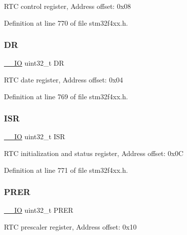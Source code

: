 R\+TC control register, Address offset\+: 0x08 

Definition at line 770 of file stm32f4xx.\+h.

\mbox{\label{struct_r_t_c___type_def_a3df0d8dfcd1ec958659ffe21eb64fa94}} 
\subsubsection{\texorpdfstring{DR}{DR}}
{\footnotesize\ttfamily \hyperlink{group___c_m_s_i_s__core__definitions_gaec43007d9998a0a0e01faede4133d6be}{\+\_\+\+\_\+\+IO} uint32\+\_\+t DR}

R\+TC date register, Address offset\+: 0x04 

Definition at line 769 of file stm32f4xx.\+h.

\mbox{\label{struct_r_t_c___type_def_ab3c49a96815fcbee63d95e1e74f20e75}} 
\subsubsection{\texorpdfstring{I\+SR}{ISR}}
{\footnotesize\ttfamily \hyperlink{group___c_m_s_i_s__core__definitions_gaec43007d9998a0a0e01faede4133d6be}{\+\_\+\+\_\+\+IO} uint32\+\_\+t I\+SR}

R\+TC initialization and status register, Address offset\+: 0x0C 

Definition at line 771 of file stm32f4xx.\+h.

\mbox{\label{struct_r_t_c___type_def_ac9b4c6c5b29f3461ce3f875eea69f35b}} 
\subsubsection{\texorpdfstring{P\+R\+ER}{PRER}}
{\footnotesize\ttfamily \hyperlink{group___c_m_s_i_s__core__definitions_gaec43007d9998a0a0e01faede4133d6be}{\+\_\+\+\_\+\+IO} uint32\+\_\+t P\+R\+ER}

R\+TC prescaler register, Address offset\+: 0x10 

